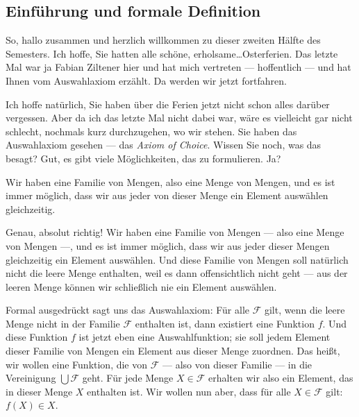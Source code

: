 \subsection{Einführung und formale Definition}

\begin{spoken-clean}[00:00:00 - 00:01:05]
So, hallo zusammen und herzlich willkommen zu dieser zweiten Hälfte des Semesters. Ich hoffe, Sie hatten alle schöne, erholsame\dots Osterferien. Das letzte Mal war ja Fabian Ziltener hier und hat mich vertreten --- hoffentlich --- und hat Ihnen vom Auswahlaxiom erzählt. Da werden wir jetzt fortfahren.

Ich hoffe natürlich, Sie haben über die Ferien jetzt nicht schon alles darüber vergessen. Aber da ich das letzte Mal nicht dabei war, wäre es vielleicht gar nicht schlecht, nochmals kurz durchzugehen, wo wir stehen. Sie haben das Auswahlaxiom gesehen --- das \emph{Axiom of Choice}. Wissen Sie noch, was das besagt? Gut, es gibt viele Möglichkeiten, das zu formulieren. Ja?
\end{spoken-clean}

\begin{student-interaction}[Studentenantwort]
Wir haben eine Familie von Mengen, also eine Menge von Mengen, und es ist immer möglich, dass wir aus jeder von dieser Menge ein Element auswählen gleichzeitig.
\end{student-interaction}

\begin{spoken-clean}[00:01:05 - 00:02:40]
Genau, absolut richtig! Wir haben eine Familie von Mengen --- also eine Menge von Mengen ---, und es ist immer möglich, dass wir aus jeder dieser Mengen gleichzeitig ein Element auswählen. Und diese Familie von Mengen soll natürlich nicht die leere Menge enthalten, weil es dann offensichtlich nicht geht --- aus der leeren Menge können wir schließlich nie ein Element auswählen.

Formal ausgedrückt sagt uns das Auswahlaxiom: Für alle $\mathcal{F}$ gilt, wenn die leere Menge nicht in der Familie $\mathcal{F}$ enthalten ist, dann existiert eine Funktion $f$. Und diese Funktion $f$ ist jetzt eben eine Auswahlfunktion; sie soll jedem Element dieser Familie von Mengen ein Element aus dieser Menge zuordnen. Das heißt, wir wollen eine Funktion, die von $\mathcal{F}$ --- also von dieser Familie --- in die Vereinigung $\bigcup \mathcal{F}$ geht. Für jede Menge $X \in \mathcal{F}$ erhalten wir also ein Element, das in dieser Menge $X$ enthalten ist. Wir wollen nun aber, dass für alle $X \in \mathcal{F}$ gilt: $f(X) \in X$.
\end{spoken-clean}

